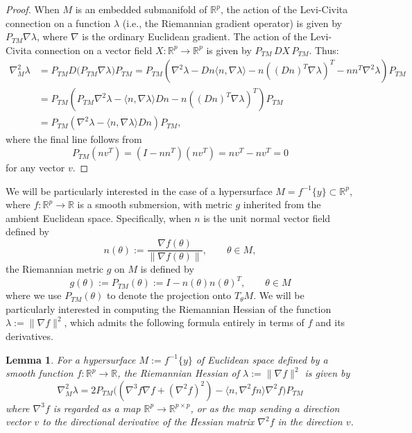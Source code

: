 \documentclass{article}
\newcommand{\RB}{\mathbb{R}}
\theoremstyle{plain}
\newtheorem{lemma}[theorem]{Lemma}
\theoremstyle{definition}
\theoremstyle{remark}
\begin{document}
\begin{proof}
    When $M$ is an embedded submanifold of $\RB^p$, the action of the Levi-Civita connection on a function $\lambda$ (i.e., the Riemannian gradient operator) is given by $P_{TM}\nabla\lambda$, where $\nabla$ is the ordinary Euclidean gradient. The action of the Levi-Civita connection on a vector field $X:\RB^p\rightarrow\RB^p$ is given by $P_{TM}\,D X\,P_{TM}$. Thus:
    \begin{align}
        \nabla^2_M\lambda &= P_{TM}D\big(P_{TM}\nabla\lambda)P_{TM} = P_{TM}(\nabla^2\lambda-D n\langle n,\nabla\lambda\rangle-n((D n)^T\nabla\lambda)^T-nn^T\nabla^2\lambda)P_{TM}\\&=P_{TM}(P_{TM}\nabla^2\lambda-\langle n,\nabla\lambda\rangle D n-n((Dn)^T\nabla\lambda)^T)P_{TM}\\&=P_{TM}(\nabla^2\lambda -\langle n, \nabla\lambda\rangle Dn)P_{TM},
    \end{align}
    where the final line follows from
    \begin{equation}
        P_{TM}(n v^T) = (I-nn^T)(nv^T) = nv^T-nv^T = 0
    \end{equation}
    for any vector $v$.
\end{proof}

We will be particularly interested in the case of a hypersurface $M = f^{-1}\{y\}\subset\RB^p$, where $f:\RB^p\rightarrow\RB$ is a smooth submersion, with metric $g$ inherited from the ambient Euclidean space. Specifically, when $n$ is the unit normal vector field defined by
\begin{equation}
    n(\theta):=\frac{\nabla f(\theta)}{\|\nabla f(\theta)\|},\qquad \theta\in M,
\end{equation}
the Riemannian metric $g$ on $M$ is defined by
\begin{equation}
    g(\theta):=P_{TM}(\theta):=I-n(\theta)n(\theta)^T,\qquad \theta\in M
\end{equation}
where we use $P_{TM}(\theta)$ to denote the projection onto $T_{\theta}M$. We will be particularly interested in computing the Riemannian Hessian of the function $\lambda:=\|\nabla f\|^2$, which admits the following formula entirely in terms of $f$ and its derivatives.

\begin{lemma}\label{lem:riemhess1}
    For a hypersurface $M:=f^{-1}\{y\}$ of Euclidean space defined by a smooth function $f:\RB^p\rightarrow\RB$, the Riemannian Hessian of $\lambda:=\|\nabla f\|^2$ is given by
    \begin{equation}
        \nabla^2_M\lambda = 2 P_{TM}\big((\nabla^3f\nabla f+(\nabla^2 f)^2)-\langle n,\nabla^2fn\rangle\nabla^2f\big)P_{TM}
    \end{equation}
    where $\nabla^3 f$ is regarded as a map $\RB^p\rightarrow \RB^{p\times p}$, or as the map sending a direction vector $v$ to the directional derivative of the Hessian matrix $\nabla^2 f$ in the direction $v$.
\end{lemma}
\end{document}
